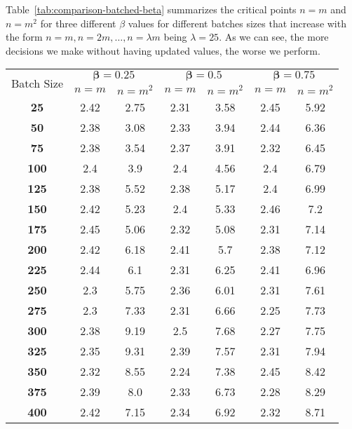 \documentclass[a4paper, 11pt]{article}
\begin{document}
Table~\ref{tab:comparison-batched-beta} summarizes the critical points $n=m$ and $n=m^2$ for three different \(\beta\) values for different batches sizes that increase with the form $n=m, n=2m, \ldots, n=\lambda m$ being \(\lambda=25\). As we can see, the more decisions we make without having updated values, the worse we perform. 
\begin{table}[H]
    \centering
    \begin{tabular}{|c||cc|cc|cc|}
        \hline
        \multirow{2}{*}{Batch Size} & \multicolumn{2}{c|}{$\mathbf{\beta = 0.25}$} & \multicolumn{2}{c|}{$\mathbf{\beta = 0.5}$} & \multicolumn{2}{c|}{$\mathbf{\beta = 0.75}$} \\ \cline{2-7}
        & $n = m$ & $n = m^2$ & $n = m$ & $n = m^2$ & $n = m$ & $n = m^2$ \\ \hline
        \textbf{25} & 2.42 & 2.75 & 2.31 & 3.58 & 2.45 & 5.92 \\ \hline
        \textbf{50} & 2.38 & 3.08 & 2.33 & 3.94 & 2.44 & 6.36 \\ \hline
        \textbf{75} & 2.38 & 3.54 & 2.37 & 3.91 & 2.32 & 6.45 \\ \hline
        \textbf{100} & 2.4 & 3.9 & 2.4 & 4.56 & 2.4 & 6.79 \\ \hline
        \textbf{125} & 2.38 & 5.52 & 2.38 & 5.17 & 2.4 & 6.99 \\ \hline
        \textbf{150} & 2.42 & 5.23 & 2.4 & 5.33 & 2.46 & 7.2 \\ \hline
        \textbf{175} & 2.45 & 5.06 & 2.32 & 5.08 & 2.31 & 7.14 \\ \hline
        \textbf{200} & 2.42 & 6.18 & 2.41 & 5.7 & 2.38 & 7.12 \\ \hline
        \textbf{225} & 2.44 & 6.1 & 2.31 & 6.25 & 2.41 & 6.96 \\ \hline
        \textbf{250} & 2.3 & 5.75 & 2.36 & 6.01 & 2.31 & 7.61 \\ \hline
        \textbf{275} & 2.3 & 7.33 & 2.31 & 6.66 & 2.25 & 7.73 \\ \hline
        \textbf{300} & 2.38 & 9.19 & 2.5 & 7.68 & 2.27 & 7.75 \\ \hline
        \textbf{325} & 2.35 & 9.31 & 2.39 & 7.57 & 2.31 & 7.94 \\ \hline
        \textbf{350} & 2.32 & 8.55 & 2.24 & 7.38 & 2.45 & 8.42 \\ \hline
        \textbf{375} & 2.39 & 8.0 & 2.33 & 6.73 & 2.28 & 8.29 \\ \hline
        \textbf{400} & 2.42 & 7.15 & 2.34 & 6.92 & 2.32 & 8.71 \\ \hline

\end{tabular}
\end{table}
\end{document}
